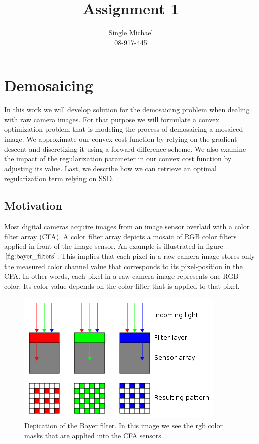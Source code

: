 \documentclass{paper}
\title{Assignment 1}
\author{Single Michael\\08-917-445}
\begin{document}
\maketitle


%

\section{Demosaicing}
In this work we will develop solution for the demosaicing problem when dealing with raw camera images. For that purpose we will formulate a convex optimization problem that is modeling the process of demosaicing a mosaiced image. We approximate our convex cost function by relying on the gradient descent and discretizing it using a forward difference scheme. We also examine the impact of the regularization parameter in our convex cost function by adjusting its value. Last, we describe how we can retrieve an optimal regularization term relying on SSD. 

\subsection{Motivation}
Most digital cameras acquire images from an image sensor overlaid with a color filter array (CFA). A color filter array depicts a mosaic of RGB color filters applied in front of the image sensor. An example is illustrated in figure $\ref{fig:bayer_filters}$. This implies that each pixel in a raw camera image stores only the measured color channel value that corresponds to its pixel-position in the CFA. In other words, each pixel in a raw camera image represents one RGB color. Its color value depends on the color filter that is applied to that pixel. 

\begin{figure}[t]
\begin{center}
\quad\quad   \includegraphics[width=0.8\linewidth]{figures/bayerfilter}
\end{center}
\caption{Depication of the Bayer filter. In this image we see the rgb color masks that are applied into the CFA sensors.}
\label{fig:bayer_filters}
\end{figure}
\end{document}
